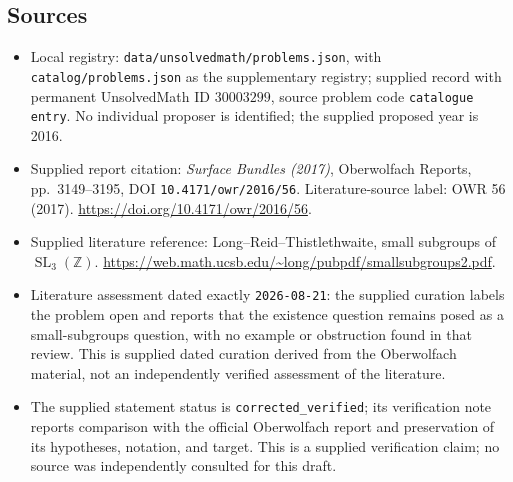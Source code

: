 \documentclass[11pt]{article}
\newcommand{\Z}{\mathbb{Z}}
\begin{document}
\subsection{Sources}
\begin{itemize}
\item Local registry: \texttt{data/unsolvedmath/problems.json}, with \texttt{catalog/problems.json} as the supplementary registry; supplied record with permanent UnsolvedMath ID \(30003299\), source problem code \texttt{catalogue entry}. No individual proposer is identified; the supplied proposed year is 2016.
\item Supplied report citation: \emph{Surface Bundles (2017)}, Oberwolfach Reports, pp.~3149--3195, DOI \texttt{10.4171/owr/2016/56}. Literature-source label: OWR 56 (2017). \url{https://doi.org/10.4171/owr/2016/56}.
\item Supplied literature reference: Long--Reid--Thistlethwaite, small subgroups of \(\operatorname{SL}_3(\Z)\). \url{https://web.math.ucsb.edu/~long/pubpdf/smallsubgroups2.pdf}.
\item Literature assessment dated exactly \texttt{2026-08-21}: the supplied curation labels the problem open and reports that the existence question remains posed as a small-subgroups question, with no example or obstruction found in that review. This is supplied dated curation derived from the Oberwolfach material, not an independently verified assessment of the literature.
\item The supplied statement status is \texttt{corrected\_verified}; its verification note reports comparison with the official Oberwolfach report and preservation of its hypotheses, notation, and target. This is a supplied verification claim; no source was independently consulted for this draft.
\end{itemize}
\end{document}
